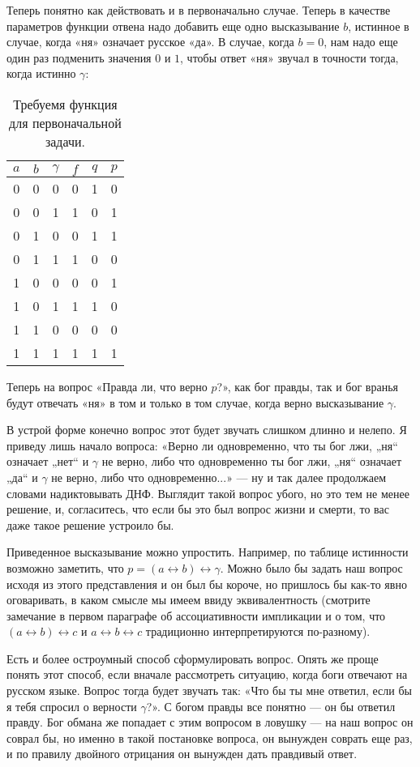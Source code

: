Теперь понятно как действовать и в первоначально случае. Теперь в качестве параметров функции отвена надо добавить еще одно высказывание $b$, истинное в случае, когда «ня» означает русское «да». В случае, когда $b = 0$, нам надо еще один раз подменить значения $0$ и $1$, чтобы ответ «ня» звучал в точности тогда, когда истинно $\gamma$:

\begin{table}[h]
\centering
\begin{tabular}{ccc|ccc}
$a$&$b$&$\gamma$&$f$&$q$&$p$\\
\hline
0&0&0&0&1&0\\
0&0&1&1&0&1\\
0&1&0&0&1&1\\
0&1&1&1&0&0\\
1&0&0&0&0&1\\
1&0&1&1&1&0\\
1&1&0&0&0&0\\
1&1&1&1&1&1
\end{tabular}
\caption{Требуемя функция для первоначальной задачи.}
\end{table}

Теперь на вопрос «Правда ли, что верно $p$?», как бог правды, так и бог вранья будут отвечать «ня» в том и только в том случае, когда верно высказывание $\gamma$.

В устрой форме конечно вопрос этот будет звучать слишком длинно и нелепо. Я приведу лишь начало вопроса: «Верно ли одновременно, что ты бог лжи, „ня“ означает „нет“ и $\gamma$ не верно, либо что одновременно ты бог лжи, „ня“ означает „да“ и $\gamma$ не верно, либо что одновременно...» — ну и так далее продолжаем словами надиктовывать ДНФ. Выглядит такой вопрос убого, но это тем не менее решение, и, согласитесь, что если бы это был вопрос жизни и смерти, то вас даже такое решение устроило бы.

Приведенное высказывание можно упростить. Например, по таблице истинности возможно заметить, что $p = (a \leftrightarrow b) \leftrightarrow \gamma$. Можно было бы задать наш вопрос исходя из этого представления и он был бы короче, но пришлось бы как-то явно оговаривать, в каком смысле мы имеем ввиду эквивалентность (смотрите замечание в первом параграфе об ассоциативности импликации и о том, что $(a\leftrightarrow b)\leftrightarrow c$ и $a \leftrightarrow b \leftrightarrow c$ традиционно интерпретируются по-разному).

Есть и более остроумный способ сформулировать вопрос. Опять же проще понять этот способ, если вначале рассмотреть ситуацию, когда боги отвечают на русском языке. Вопрос тогда будет звучать так: «Что бы ты мне ответил, если бы я тебя спросил о верности $\gamma$?». С богом правды все понятно — он бы ответил правду. Бог обмана же попадает с этим вопросом в ловушку — на наш вопрос он соврал бы, но именно в такой постановке вопроса, он вынужден соврать еще раз, и по правилу двойного отрицания он вынужден дать правдивый ответ.


